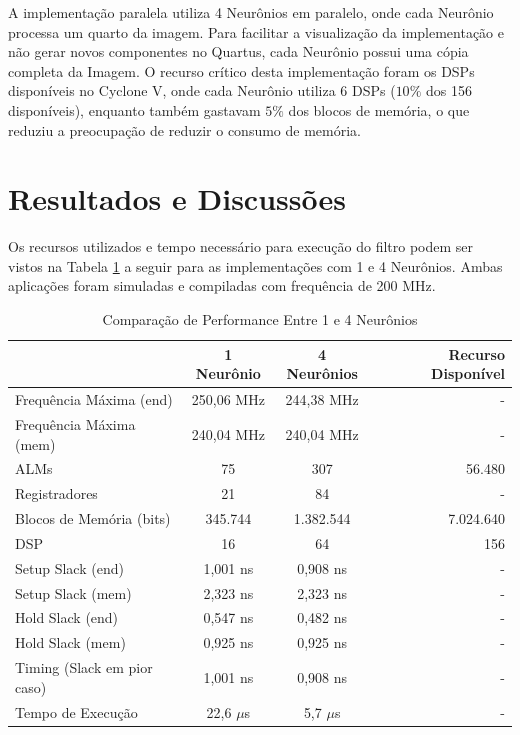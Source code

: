 \documentclass[12pt]{article}
\begin{document}
A implementação paralela utiliza 4 Neurônios em paralelo, onde cada Neurônio processa
um quarto da imagem. Para facilitar a visualização da implementação e não gerar novos
componentes no Quartus, cada Neurônio possui uma cópia completa da Imagem. O recurso crítico
desta implementação foram os DSPs disponíveis no Cyclone V, onde cada Neurônio utiliza 6 DSPs
($10\%$ dos 156 disponíveis), enquanto também gastavam $5\%$ dos blocos de memória, o
que reduziu a preocupação de reduzir o consumo de memória.\\

\section{Resultados e Discussões}

Os recursos utilizados e tempo necessário para execução do filtro podem ser vistos
na Tabela \ref{tab:comp} a seguir para as implementações com 1 e 4 Neurônios.
Ambas aplicações foram simuladas e compiladas com frequência de 200 MHz.\\

\begin{table}[h]
	\centering
	\caption{Comparação de Performance Entre 1 e 4 Neurônios}
	\begin{tabular}{|l|c|c|r|}
		\hline
		 & 1 Neurônio & 4 Neurônios & Recurso Disponível \\
		\hline
		Frequência Máxima (end)		& 250,06 MHz	& 244,38 MHz	& - \\
		Frequência Máxima (mem)		& 240,04 MHz	& 240,04 MHz	& - \\
		ALMs 						& 75			& 307			& 56.480 \\
		Registradores				& 21			& 84			& - \\
		Blocos de Memória (bits)	& 345.744		& 1.382.544		& 7.024.640 \\
		DSP							& 16			& 64			& 156 \\
		Setup Slack (end)			& 1,001 ns		& 0,908	ns		& - \\
		Setup Slack (mem)			& 2,323 ns		& 2,323 ns		& - \\
		Hold Slack (end)			& 0,547 ns		& 0,482 ns		& - \\
		Hold Slack (mem)			& 0,925 ns		& 0,925 ns		& - \\
		Timing (Slack em pior caso)	& 1,001 ns		& 0,908 ns		& - \\
		Tempo de Execução			& 22,6 $\mu$s	& 5,7 $\mu$s	& - \\
		\hline
	\end{tabular}
	\label{tab:comp}
\end{table}
	
\end{document}
